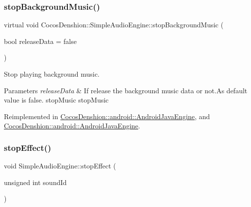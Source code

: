 \subsubsection{\texorpdfstring{stop\+Background\+Music()}{stopBackgroundMusic()}\hspace{0.1cm}{\footnotesize\ttfamily [2/2]}}
{\footnotesize\ttfamily virtual void Cocos\+Denshion\+::\+Simple\+Audio\+Engine\+::stop\+Background\+Music (\begin{DoxyParamCaption}\item[{bool}]{release\+Data = {\ttfamily false} }\end{DoxyParamCaption})\hspace{0.3cm}{\ttfamily [virtual]}}

Stop playing background music.


\begin{DoxyParams}{Parameters}
{\em release\+Data} & If release the background music data or not.\+As default value is false.  stop\+Music  stop\+Music \\
\hline
\end{DoxyParams}


Reimplemented in \hyperlink{classCocosDenshion_1_1android_1_1AndroidJavaEngine_af9a747a87ff0744c9de7f76208637e0c}{Cocos\+Denshion\+::android\+::\+Android\+Java\+Engine}, and \hyperlink{classCocosDenshion_1_1android_1_1AndroidJavaEngine_a736969e835ddb130f9f25976af4ed94f}{Cocos\+Denshion\+::android\+::\+Android\+Java\+Engine}.

\mbox{\label{classCocosDenshion_1_1SimpleAudioEngine_a118f6e08368f543957356a7da8ad8f71}} 
\subsubsection{\texorpdfstring{stop\+Effect()}{stopEffect()}\hspace{0.1cm}{\footnotesize\ttfamily [1/2]}}
{\footnotesize\ttfamily void Simple\+Audio\+Engine\+::stop\+Effect (\begin{DoxyParamCaption}\item[{unsigned int}]{sound\+Id }\end{DoxyParamCaption})\hspace{0.3cm}{\ttfamily [virtual]}}


